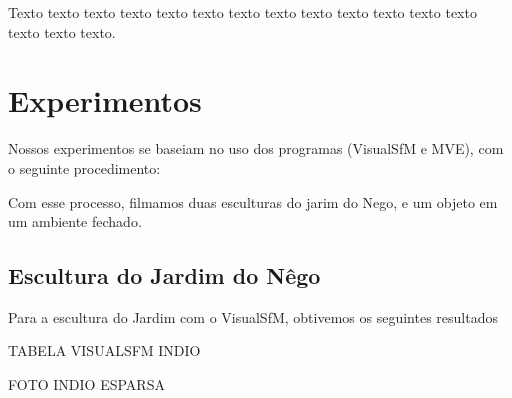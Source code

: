 \documentclass[table, usenames, svgnames, xcolor=dvipsnames]{beamer}
\begin{document}
\begin{frame} 
	\begin{center}
		Texto texto texto texto texto texto texto texto texto texto texto texto texto
		texto texto texto.
	\end{center}
\end{frame}

\section{Experimentos}

\begin{frame}
	\begin{center}
		Nossos experimentos se baseiam no uso dos programas (VisualSfM e MVE), com o seguinte procedimento:
	\end{center}
\end{frame}

\begin{frame}
	\begin{center}
	\end{center}
\end{frame}

\begin{frame}
	\begin{center}
		Com esse processo, filmamos duas esculturas do jarim do Nego, e um objeto em um ambiente fechado. 
	\end{center}
\end{frame}

\subsection{Escultura do Jardim do Nêgo}

\begin{frame}
	Para a escultura do Jardim com o VisualSfM, obtivemos os seguintes resultados
	
	TABELA VISUALSFM INDIO
\end{frame}

\begin{frame}
	FOTO INDIO ESPARSA
\end{frame}
\end{document}
